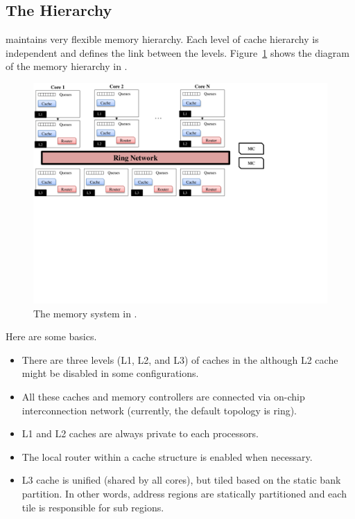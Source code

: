 \subsection{The Hierarchy}
\label{sec:memhierarchy}

\SIM maintains very flexible memory hierarchy. Each level of cache 
hierarchy is independent and \SIM defines the link between the
levels. Figure~\ref{fig:memory} shows the diagram of the memory
hierarchy in \SIM.

\begin{figure}[htb]
\centering
\includegraphics[width=6.5in]{figs/memory}
\caption{The memory system in \SIM.}
\label{fig:memory}
\end{figure}



Here are some basics.


\begin{itemize}
  \item There are three levels (L1, L2, and L3) of caches in the \SIM
  although L2 cache might be disabled in some configurations.

  \item All these caches and memory controllers are connected via
  on-chip interconnection network (currently, the default topology is
  ring).

  \item L1 and L2 caches are always private to each processors.

  \item The local router within a cache structure is enabled when
  necessary.

  \item L3 cache is unified (shared by all cores), but tiled based on
  the static bank partition. In other words, address regions are
  statically partitioned and each tile is responsible for sub regions.

\end{itemize}


